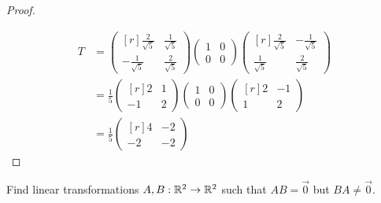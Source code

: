 \documentclass{article}
\begin{document}
\begin{proof}
{\begin{center}
  \end{center}
  }
  \begin{align*}
    T&=
    \begin{pmatrix*}[r]
      \frac{2}{\sqrt{5}}  &\frac{1}{\sqrt{5}}\\[0.3cm]
      -\frac{1}{\sqrt{5}} &\frac{2}{\sqrt{5}}
    \end{pmatrix*}
    \begin{pmatrix} 1&0\\0&0 \end{pmatrix}
    \begin{pmatrix*}[r]
      \frac{2}{\sqrt{5}}  &-\frac{1}{\sqrt{5}}\\[0.3cm]
      \frac{1}{\sqrt{5}}  &\frac{2}{\sqrt{5}}
    \end{pmatrix*}\\[0.3cm]
    &=
    \frac{1}{5}
    \begin{pmatrix*}[r] 2 &1\\-1&2 \end{pmatrix*}
    \begin{pmatrix} 1&0\\0&0 \end{pmatrix}
    \begin{pmatrix*}[r] 2 &-1\\1&2 \end{pmatrix*}\\[0.3cm]
    &=
    \frac{1}{5}
    \begin{pmatrix*}[r]
      4&-2\\-2&-2
    \end{pmatrix*}
  \end{align*}
\end{proof}
\begin{exercise}
  Find linear transformations $A,B:\R^2\to\R^2$ such that 
  $AB=\vec{0}$ but $BA\neq \vec{0}$.
\end{exercise}
\end{document}
